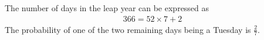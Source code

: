 The number of days in the leap year can be expressed as
\begin{align}
		366 = 52 \times 7 + 2 
\end{align}
The probability of one of the two remaining days being a Tuesday is 
 $\frac{2}{7}$.



